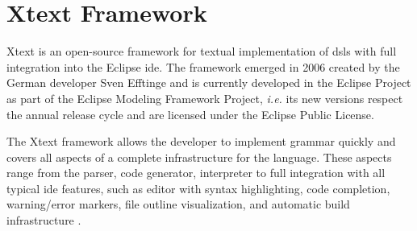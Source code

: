 \section{Xtext Framework}
\label{sec_back:xtext}

Xtext is an open-source framework for textual implementation of \acp{dsl} with full integration into the Eclipse \ac{ide}.
The framework emerged in 2006 created by the German developer Sven Efftinge and is currently developed in the Eclipse Project as part of the Eclipse Modeling Framework Project, \textit{i.e.} its new versions respect the annual release cycle and are licensed under the Eclipse Public License.

The Xtext framework allows the developer to implement grammar quickly and covers all aspects of a complete infrastructure for the language.
These aspects range from the parser, code generator, interpreter to full integration with all typical \ac{ide} features, such as editor with syntax highlighting, code completion, warning/error markers, file outline visualization, and automatic build infrastructure \cite{Bettini:2016}.


